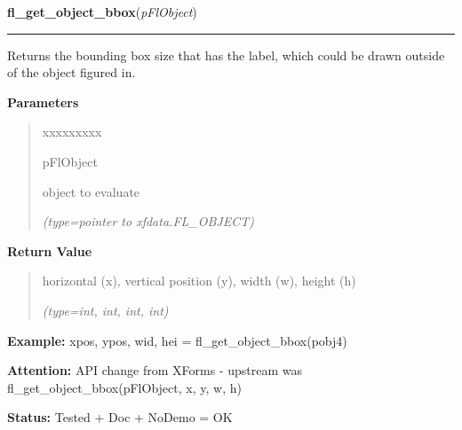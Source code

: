     \vspace{0.5ex}

\hspace{.8\funcindent}\begin{boxedminipage}{\funcwidth}

    \raggedright \textbf{fl\_get\_object\_bbox}(\textit{pFlObject})

    \vspace{-1.5ex}

    \rule{\textwidth}{0.5\fboxrule}
\setlength{\parskip}{2ex}
    Returns the bounding box size that has the label, which could be drawn 
    outside of the object figured in.

\setlength{\parskip}{1ex}
      \textbf{Parameters}
      \vspace{-1ex}

      \begin{quote}
        \begin{Ventry}{xxxxxxxxx}

          \item[pFlObject]

          object to evaluate

            {\it (type=pointer to xfdata.FL\_OBJECT)}

        \end{Ventry}

      \end{quote}

      \textbf{Return Value}
    \vspace{-1ex}

      \begin{quote}
      horizontal (x), vertical position (y), width (w), height (h)

      {\it (type=int, int, int, int)}

      \end{quote}

\textbf{Example:} xpos, ypos, wid, hei = fl\_get\_object\_bbox(pobj4)



\textbf{Attention:} API change from XForms - upstream was fl\_get\_object\_bbox(pFlObject, x, 
y, w, h)



\textbf{Status:} Tested + Doc + NoDemo = OK



    \end{boxedminipage}

    \label{xformslib:flbasic:fl_get_object_bbox}

